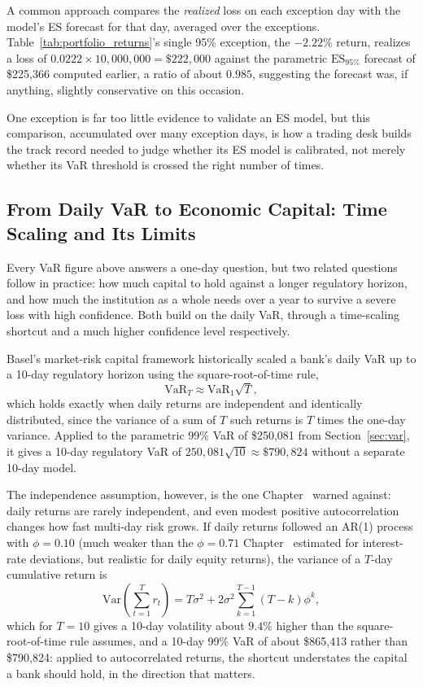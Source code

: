 \documentclass[../ai_in_finance]{subfiles}
\begin{document}
A common approach compares the \emph{realized} loss on each exception day with the model's ES forecast for that day, averaged over the exceptions. Table~\ref{tab:portfolio_returns}'s single 95\% exception, the $-2.22\%$ return, realizes a loss of $0.0222 \times 10{,}000{,}000 = \$222{,}000$ against the parametric $\text{ES}_{95\%}$ forecast of \$225,366 computed earlier, a ratio of about $0.985$, suggesting the forecast was, if anything, slightly conservative on this occasion.

One exception is far too little evidence to validate an ES model, but this comparison, accumulated over many exception days, is how a trading desk builds the track record needed to judge whether its ES model is calibrated, not merely whether its VaR threshold is crossed the right number of times.

\subsection{From Daily VaR to Economic Capital: Time Scaling and Its Limits}
\label{sec:econ-capital}

Every VaR figure above answers a one-day question, but two related questions follow in practice: how much capital to hold against a longer regulatory horizon, and how much the institution as a whole needs over a year to survive a severe loss with high confidence. Both build on the daily VaR, through a time-scaling shortcut and a much higher confidence level respectively.

Basel's market-risk capital framework historically scaled a bank's daily VaR up to a 10-day regulatory horizon using the square-root-of-time rule,
\begin{equation}
\label{eq:marketrisk-sqrt-t}
\text{VaR}_T \approx \text{VaR}_1 \sqrt{T},
\end{equation}
which holds exactly when daily returns are independent and identically distributed, since the variance of a sum of $T$ such returns is $T$ times the one-day variance. Applied to the parametric 99\% VaR of \$250,081 from Section~\ref{sec:var}, it gives a 10-day regulatory VaR of $250{,}081\sqrt{10}\approx\$790{,}824$ without a separate 10-day model.

The independence assumption, however, is the one Chapter~ warned against: daily returns are rarely independent, and even modest positive autocorrelation changes how fast multi-day risk grows. If daily returns followed an AR(1) process with $\phi=0.10$ (much weaker than the $\phi=0.71$ Chapter~ estimated for interest-rate deviations, but realistic for daily equity returns), the variance of a $T$-day cumulative return is
\begin{equation*}
\text{Var}\left(\sum_{t=1}^T r_t\right) = T\sigma^2 + 2\sigma^2\sum_{k=1}^{T-1}(T-k)\phi^k,
\end{equation*}
which for $T=10$ gives a 10-day volatility about $9.4\%$ higher than the square-root-of-time rule assumes, and a 10-day 99\% VaR of about \$865,413 rather than \$790,824: applied to autocorrelated returns, the shortcut understates the capital a bank should hold, in the direction that matters.
\end{document}

